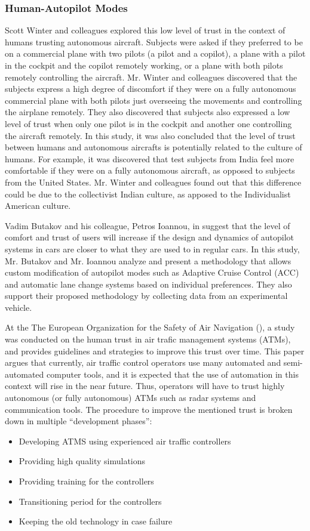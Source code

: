 \documentclass[runningheads,a4paper]{llncs}
\begin{document}
\subsubsection{Human-Autopilot Modes}
Scott Winter and colleagues \cite{winter2015indian} explored this low level of trust in the context of humans trusting autonomous aircraft. Subjects were asked if they preferred to be on a commercial plane with two pilots (a pilot and a copilot), a plane with a pilot in the cockpit and the copilot remotely working, or a plane with both pilots remotely controlling the aircraft. Mr. Winter and colleagues discovered that the subjects express a high degree of discomfort if they were on a fully autonomous commercial plane with both pilots just overseeing the movements and controlling the airplane remotely. They also discovered that subjects also expressed a low level of trust when only one pilot is in the cockpit and another one controlling the aircraft remotely. In this study, it was also concluded that the level of trust between humans and autonomous aircrafts is potentially related to the culture of humans. For example, it was discovered that test subjects from India feel more comfortable if they were on a fully autonomous aircraft, as opposed to subjects from the United States. Mr. Winter and colleagues found out that this difference could be due to the collectivist Indian culture, as apposed to the Individualist American culture.

Vadim Butakov and his colleague, Petros Ioannou, in \cite{butakov2015driving} suggest that the level of comfort and trust of users will increase if the design and dynamics of autopilot systems in cars are closer to what they are used to in regular cars. In this study, Mr. Butakov and Mr. Ioannou analyze and present a methodology that allows custom modification of autopilot modes such as  Adaptive Cruise Control (ACC) and automatic lane change systems based on individual preferences. They also support their proposed methodology by collecting data from an experimental vehicle.

At the The European Organization for the Safety of Air Navigation (\cite{kelly2003guidelines}), a study was conducted on the human trust in air trafic management systems (ATMs), and provides guidelines and strategies to improve this trust over time. This paper argues that currently, air traffic control operators use many automated and semi-automated computer tools, and it is expected that the use of automation in this context will rise in the near future. Thus, operators will have to trust highly autonomous (or fully autonomous) ATMs such as radar systems and communication tools. The procedure to improve the mentioned trust is broken down in multiple ``development phases'':
\begin{itemize}
	\item Developing ATMS using experienced air traffic controllers
	\item Providing high quality simulations
	\item Providing training for the controllers
	\item Transitioning period for the controllers
	\item Keeping the old technology in case failure
\end{itemize}
\end{document}
